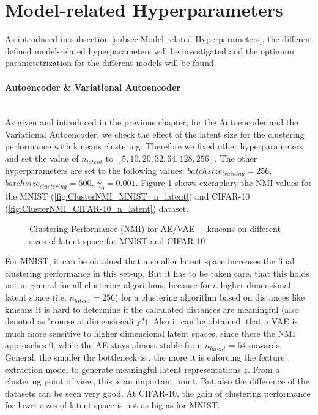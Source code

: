\documentclass[12pt,DIV14,BCOR12mm,a4paper,footexclude,headinclude,halfparskip-,twoside,openright,cleardoubleempty,idxtotoc,bibtotoc,listtotoc]{scrreprt} %
\numberwithin{equation}{chapter}
\begin{document}
\section{Model-related Hyperparameters}
As introduced in subsection \ref{subsec:Model-related Hyperparameters}, the different defined model-related hyperparameters will be investigated and the optimum parametetrization for the different models will be found. 
\paragraph{Autoencoder \& Variational Autoencoder}\hfill \\
As given and introduced in the previous chapter, for the Autoencoder and the Variational Autoencoder, we check the effect of the latent size for the clustering performance with kmeans clustering. Therefore we fixed other hyperparameters and set the value of $n_{latent}$ to $[5, 10, 20, 32, 64, 128, 256]$. The other hyperparameters are set to the following values: $batchsize_{training} = 256$, $batchsize_{clustering} = 500$, $\gamma_0 = 0.001$. Figure \ref{fig:ClusterPerformance_latentSpace} shows exemplary the NMI values for the MNIST (\ref{fig:ClusterNMI_MNIST_n_latent}) and CIFAR-10 (\ref{fig:ClusterNMI_CIFAR-10_n_latent}) dataset.
	\begin{figure}[htb!]
		\centering
		\qquad
		\caption{Clustering Performance (NMI) for AE/VAE + kmeans on different sizes of latent space for MNIST and CIFAR-10}
		\label{fig:ClusterPerformance_latentSpace}
	\end{figure}
For MNIST, it can be obtained that a smaller latent space increases the final clustering performance in this set-up. But it has to be taken care, that this holds not in general for all clustering algorithms, because for a higher dimensional latent space (i.e. $n_{latent} = 256$) for a clustering algorithm based on distances like kmeans it is hard to determine if the calculated distances are meaningful (also denoted as "course of dimensionality"). Also it can be obtained, that a VAE is much more sensitive to higher dimensional latent spaces, since there the NMI approaches $0$, while the AE stays almost stable from $n_{latent} = 64$ onwards. General, the smaller the bottleneck is , the more it is enforcing the feature extraction model to generate meaningful latent representations $\underline{z}$. From a clustering point of view, this is an important point. But also the difference of the datasets can be seen very good. At CIFAR-10, the gain of clustering performance for lower sizes of latent space is not as big as for MNIST. 
\end{document}
